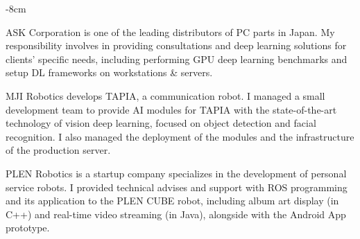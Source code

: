 \documentclass[10pt,a4paper]{altacv}
\begin{document}

\begin{adjustwidth}{}{-8cm}
\makecvheader
\end{adjustwidth}


ASK Corporation is one of the leading distributors of PC parts in Japan. My responsibility involves in providing consultations and deep learning solutions for clients' specific needs, including performing GPU deep learning benchmarks and setup DL frameworks on workstations \& servers.

\divider

MJI Robotics develops TAPIA, a communication robot. I managed a small development team to provide AI modules for TAPIA with the state-of-the-art technology of vision deep learning, focused on object detection and facial recognition. I also managed the deployment of the modules and the infrastructure of the production server.

\divider

PLEN Robotics is a startup company specializes in the development of personal service robots.
I provided technical advises and support with ROS programming and its application to the PLEN CUBE robot, including album art display (in C++) and real-time video streaming (in Java), alongside with the Android App prototype.
\end{document}
